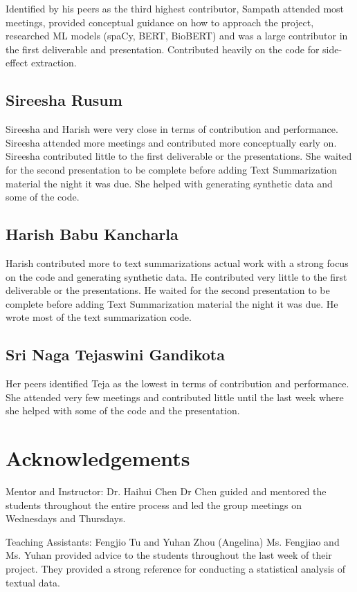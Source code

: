 \documentclass[sigplan,screen]{acmart}
\begin{document}
Identified by his peers as the third highest contributor, Sampath attended most meetings, provided conceptual guidance on how to approach the project, researched ML models (spaCy, BERT, BioBERT) and was a large contributor in the first deliverable and presentation. Contributed heavily on the code for side-effect extraction. 

\subsection{Sireesha Rusum} 

Sireesha and Harish were very close in terms of contribution and performance. Sireesha attended more meetings and contributed more conceptually early on. Sireesha contributed little to the first deliverable or the presentations. She waited for the second presentation to be complete before adding Text Summarization material the night it was due. She helped with generating synthetic data and some of the code.

\subsection{Harish Babu Kancharla} 

Harish contributed more to text summarizations actual work with a strong focus on the code and generating synthetic data. He contributed very little to the first deliverable or the presentations. He waited for the second presentation to be complete before adding Text Summarization material the night it was due. He wrote most of the text summarization code.

\subsection{Sri Naga Tejaswini Gandikota} 

Her peers identified Teja as the lowest in terms of contribution and performance. She attended very few meetings and contributed little until the last week where she helped with some of the code and the presentation.

\section{Acknowledgements}

Mentor and Instructor: Dr. Haihui Chen
Dr Chen guided and mentored the students throughout the entire process and led the group meetings on Wednesdays and Thursdays.

Teaching Assistants: Fengjio Tu and Yuhan Zhou (Angelina)
Ms. Fengjiao and Ms. Yuhan provided advice to the students throughout the last week of their project. They provided a strong reference for conducting a statistical analysis of textual data.




\end{document}
